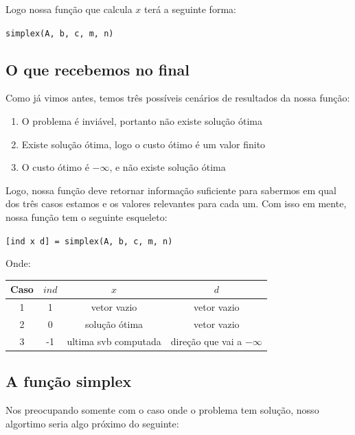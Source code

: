 \documentclass[12pt]{article}
\begin{document}
    Logo nossa função que calcula $x$ terá a seguinte forma: \\
    \begin{center}
    \texttt{simplex(A, b, c, m, n)}
    \end{center}

\subsection{O que recebemos no final}
    Como já vimos antes, temos três possíveis cenários de resultados da nossa função:
    \begin{enumerate}
        \item O problema é inviável, portanto não existe solução ótima
        \item Existe solução ótima, logo o custo ótimo é um valor finito
        \item O custo ótimo é $-\infty$, e não existe solução ótima
    \end{enumerate}
    Logo, nossa função deve retornar informação suficiente para sabermos em qual dos três casos estamos e os valores relevantes para cada um. Com isso em mente, nossa função tem o seguinte esqueleto:
    \begin{center}
        \texttt{[ind x d] = simplex(A, b, c, m, n)}
    \end{center}
    Onde:
    \begin{center}
    \begin{tabular}{ c  c  c  c }
        \textbf{Caso} & $ind$ & $x$  & $d$ \\  \hline
        1    & 1   & vetor vazio & vetor vazio \\
        2    & 0   & solução ótima & vetor vazio \\
        3    & -1  & ultima svb computada & direção que vai a $-\infty$ \\
    \end{tabular}
    \end{center}

\subsection{A função simplex}
    Nos preocupando somente com o caso onde o problema tem solução, nosso algortimo seria algo próximo do seguinte: 
\end{document}
